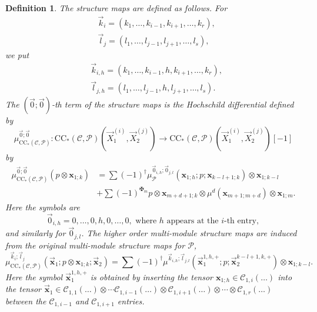 \documentclass[11pt]{amsproc}
\def\cP{\mathcal{P}}
\def\cc{\mathcal{C}}
\def\r#1{\mathrm{#1}}
\newtheorem{defn}[lem]{Definition}
\theoremstyle{remark}
\numberwithin{equation}{section}
\begin{document}
\begin{defn}
The structure maps are defined as follows.
For 
\begin{align}
& \vec{k}_{i} = (k_{1}, \ldots, k_{i-1}, k_{i+1}, \ldots, k_{r}), \\
& \vec{l}_{j}=(l_{1}, \ldots, l_{j-1}, l_{j+1}, \ldots, l_{s}),
\end{align}
we put 
\begin{align}
&\vec{k}_{i, h} = (k_{1}, \ldots, k_{i-1}, h, k_{i+1}, \ldots, k_{r}), \\
& \vec{l}_{j, h}=(l_{1}, \ldots, l_{j-1}, h, l_{j+1}, \ldots, l_{s}).
\end{align}
The $(\vec{0}; \vec{0})$-th term of the structure maps is the Hochschild differential defined by
\begin{equation}
\mu_{\r{CC}_{*}(\cc, \cP)}^{\vec{0}; \vec{0}}: \r{CC}_{*}(\cc, \cP)(\vec{X}_{1}^{(i)}, \vec{X}_{2}^{(j)}) \to \r{CC}_{*}(\cc, \cP)(\vec{X}_{1}^{(i)}, \vec{X}_{2}^{(j)})[-1]
\end{equation}
by
\begin{equation}
\begin{split}
\mu_{\r{CC}_{*}(\cc, \cP)}^{\vec{0}; \vec{0}}(p \otimes \mathbf{x}_{1; k}) & = \sum (-1)^{\dagger} \mu_{\cP}^{\vec{0}_{i, h}; \vec{0}_{j, l}} (\mathbf{x}_{1; h}; p; \mathbf{x}_{k-l+1; k}) \otimes \mathbf{x}_{1; k-l}\\
& + \sum (-1)^{\maltese_{m}} p \otimes \mathbf{x}_{m+d+1; k} \otimes \mu^{d}(\mathbf{x}_{m+1; m+d}) \otimes \mathbf{x}_{1; m}.
\end{split}
\end{equation}
Here the symbols are
\begin{equation}
\vec{0}_{i, h} = 0, \ldots, 0, h, 0, \ldots, 0, \text{ where } h \text{ appears at the } i\text{-th entry},
\end{equation}
and similarly for $\vec{0}_{j, l}$.
The higher order multi-module structure maps are induced from the original multi-module structure maps for $\cP$,
\begin{equation}
\mu_{\r{CC}_{*}(\cc, \cP)}^{\vec{k}_{i}; \vec{l}_{j}}(\vec{\mathbf{x}}_{1}; p \otimes \mathbf{x}_{1;k}; \vec{\mathbf{x}}_{2}) = \sum (-1)^{\dagger} \mu^{\vec{k}_{i, h}; \vec{l}_{j, l}}(\vec{\mathbf{x}}_{1}^{1,h,+}; p; \vec{\mathbf{x}}_{2}^{k-l+1,k,+}) \otimes \mathbf{x}_{1;k-l}.
\end{equation}
Here the symbol $\vec{\mathbf{x}}_{1}^{1, h, +}$ is obtained by inserting the tensor $\mathbf{x}_{1;h} \in \cc_{1, i}(\ldots)$ into the tensor $\vec{\mathbf{x}}_{1} \in \cc_{1,1}(\ldots) \otimes \cdots \cc_{1,i-1}(\ldots) \otimes \cc_{1,i+1}(\ldots) \otimes \cdots \otimes \cc_{1, r}(\ldots)$ between the $\cc_{1,i-1}$ and $\cc_{1,i+1}$ entries.
\end{defn}
\end{document}
